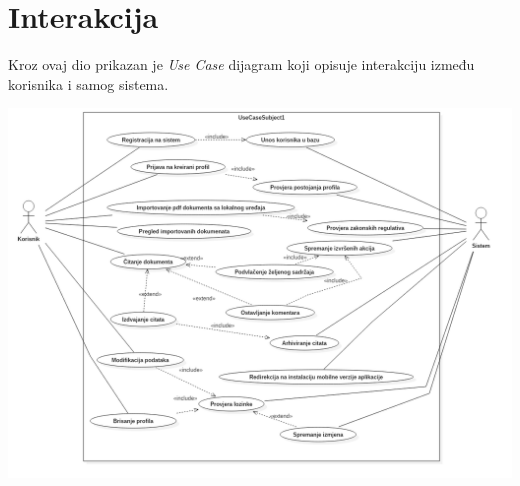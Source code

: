 \chapter{Interakcija}

Kroz ovaj dio prikazan je \textit{Use Case} dijagram koji opisuje interakciju između korisnika i samog sistema.

\begin{center}
    \includegraphics[scale=0.42]{images/UseCaseDijagram.png}
\end{center}